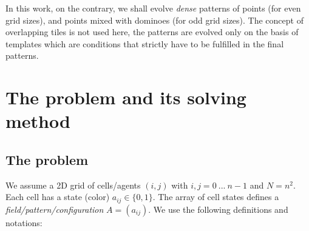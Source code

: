 \documentclass[10pt,a4paper]{article}  %
\begin{document}
In this work, on the contrary, we shall evolve \textit{dense} patterns 
of points (for even grid sizes), and points mixed with dominoes (for odd grid sizes).
The concept of overlapping tiles is not used here, the patterns are evolved
only on the basis of templates which are conditions that strictly have to be
fulfilled in the final patterns.  


\section{The problem and its solving method}

\subsection{The problem}


We assume a 2D grid of cells/agents $(i,j)$ with $i,j = 0~...~n-1$ and $N=n^2$.
Each cell has a state (color) $a_{ij} \in \{0,1\}$.
The array of cell states defines a \textit{field/pattern/configuration} $A = (a_{ij})$.
We use the following definitions and notations:
\end{document}
